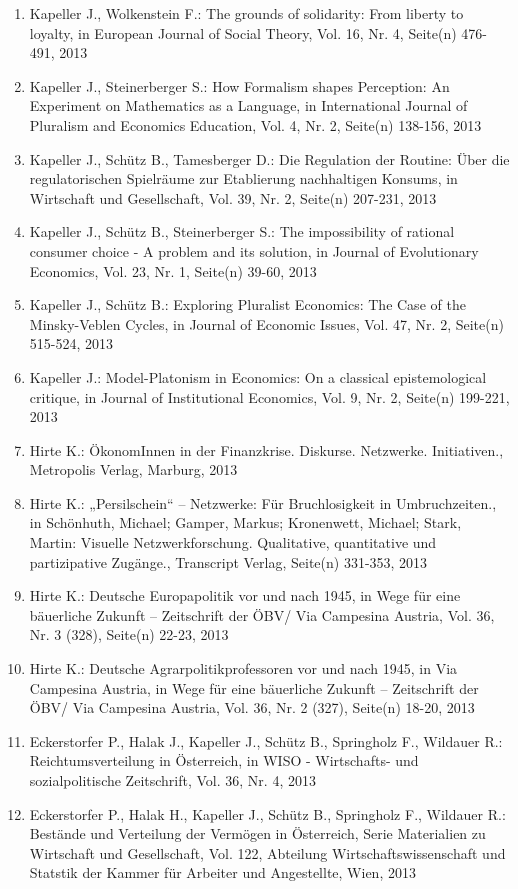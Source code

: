 \begin{enumerate}
	 \item Kapeller J., Wolkenstein F.: The grounds of solidarity: From liberty to loyalty, in European Journal of Social Theory, Vol. 16, Nr. 4, Seite(n) 476-491, 2013
	 \item Kapeller J., Steinerberger S.: How Formalism shapes Perception: An Experiment on Mathematics as a Language, in International Journal of Pluralism and Economics Education, Vol. 4, Nr. 2, Seite(n) 138-156, 2013
	 \item Kapeller J., Schütz B., Tamesberger D.: Die Regulation der Routine: Über die regulatorischen Spielräume zur Etablierung nachhaltigen Konsums, in Wirtschaft und Gesellschaft, Vol. 39, Nr. 2, Seite(n) 207-231, 2013
	 \item Kapeller J., Schütz B., Steinerberger S.: The impossibility of rational consumer choice - A problem and its solution, in Journal of Evolutionary Economics, Vol. 23, Nr. 1, Seite(n) 39-60, 2013
	 \item Kapeller J., Schütz B.: Exploring Pluralist Economics: The Case of the Minsky-Veblen Cycles, in Journal of Economic Issues, Vol. 47, Nr. 2, Seite(n) 515-524, 2013
	 \item Kapeller J.: Model-Platonism in Economics: On a classical epistemological critique, in Journal of Institutional Economics, Vol. 9, Nr. 2, Seite(n) 199-221, 2013
	 \item Hirte K.: ÖkonomInnen in der Finanzkrise. Diskurse. Netzwerke. Initiativen., Metropolis Verlag, Marburg, 2013
	 \item Hirte K.: „Persilschein“ – Netzwerke: Für Bruchlosigkeit in Umbruchzeiten., in Schönhuth, Michael; Gamper, Markus; Kronenwett, Michael; Stark, Martin: Visuelle Netzwerkforschung. Qualitative, quantitative und partizipative Zugänge., Transcript Verlag, Seite(n) 331-353, 2013
	 \item Hirte K.: Deutsche Europapolitik vor und nach 1945, in Wege für eine bäuerliche Zukunft – Zeitschrift der ÖBV/ Via Campesina Austria, Vol. 36, Nr. 3 (328), Seite(n) 22-23, 2013
	 \item Hirte K.: Deutsche Agrarpolitikprofessoren vor und nach 1945, in Via Campesina Austria, in Wege für eine bäuerliche Zukunft – Zeitschrift der ÖBV/ Via Campesina Austria, Vol. 36, Nr. 2 (327), Seite(n) 18-20, 2013
	 \item Eckerstorfer P., Halak J., Kapeller J., Schütz B., Springholz F., Wildauer R.: Reichtumsverteilung in Österreich, in WISO - Wirtschafts- und sozialpolitische Zeitschrift, Vol. 36, Nr. 4, 2013
	 \item Eckerstorfer P., Halak H., Kapeller J., Schütz B., Springholz F., Wildauer R.: Bestände und Verteilung der Vermögen in Österreich, Serie Materialien zu Wirtschaft und Gesellschaft, Vol. 122, Abteilung Wirtschaftswissenschaft und Statstik der Kammer für Arbeiter und Angestellte, Wien, 2013

\end{enumerate}
